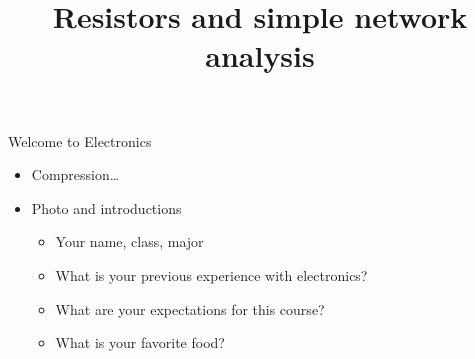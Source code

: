 \documentclass[beamer]{standalone}
\begin{document}
\title[Electronics]{Resistors and simple network analysis}

\begin{frame} 
  \titlepage
\end{frame}




\begin{frame}{Welcome to Electronics}
 \begin{itemize}
  \item Compression\ldots
  \item Photo and introductions
  \begin{itemize}
   \item Your name, class, major
   \item What is your previous experience with electronics?
   \item What are your expectations for this course?
   \item What is your favorite food? %
  \end{itemize}
 \end{itemize}
\end{frame}
\end{document}
